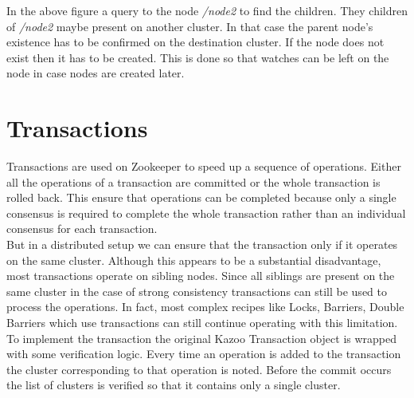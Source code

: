 

In the above figure a query to the node \textit{/node2} to find the children. They children of \textit{/node2} maybe present on another cluster. In that case the parent node's existence has to be confirmed on the destination cluster. If the node does not exist then it has to be created. This is done so that watches can be left on the node in case nodes are created later.

\section{Transactions}
Transactions are used on Zookeeper to speed up a sequence of operations. Either all the operations of a transaction are committed or the whole transaction is rolled back. This ensure that operations can be completed because only a single consensus is required to complete the whole transaction rather than an individual consensus for each transaction.\\
    But in a distributed setup we can ensure that the transaction only if it operates on the same cluster. Although this appears to be a substantial disadvantage, most transactions operate on sibling nodes. Since all siblings are present on the same cluster in the case of strong consistency transactions can still be used to process the operations. In fact, most complex recipes like Locks, Barriers, Double Barriers which use transactions can still continue operating with this limitation.
    To implement the transaction the original Kazoo Transaction object is wrapped with some verification logic. Every time an operation is added to the transaction the cluster corresponding to that operation is noted. Before the commit occurs the list of clusters is verified so that it contains only a single cluster.
    
